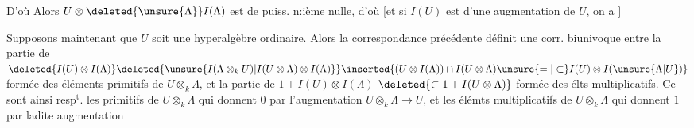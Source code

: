  D'où
Alors $U\otimes\deleted{\unsure{\Lambda}} I(\Lambda)$ est de puiss. n:ième
nulle, d'où
[et si $I(U)$ est  d'une
augmentation de $U$, on a
\hfill$]$

Supposons maintenant que $U$ soit une
hyperalgèbre ordinaire. Alors la correspondance
précédente définit une corr. biunivoque
entre la partie de $\deleted{I(U)\otimes I(\Lambda)}\deleted{\unsure{I(\Lambda\otimes_k U)|I(U\otimes\Lambda)\otimes I(\Lambda)}}\inserted{(U\otimes I(\Lambda))\cap I(U\otimes\Lambda)\unsure{=|\subset} I(U)\otimes I(\unsure{\Lambda|U})}$ formée
des éléments primitifs  de $U\otimes_k\Lambda$, et
la partie de $1+I(U)\otimes I(\Lambda)$ $\deleted{\subset 1+I(U\otimes\Lambda)}$
formée des élts multiplicatifs. Ce
sont ainsi resp$^{\mathrm t}$. les primitifs de
$U\otimes_k\Lambda$ qui donnent $0$ par l'augmentation
$U\otimes_k\Lambda\longrightarrow U$, et les élémts multiplicatifs de
$U\otimes_k\Lambda$ qui donnent $1$ par ladite augmentation

